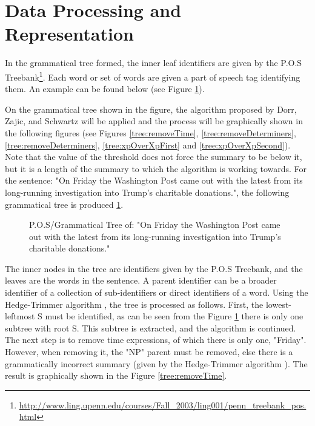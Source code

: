 \section{Data Processing and Representation}
\par In the grammatical tree formed, the inner leaf identifiers are given by the P.O.S Treebank\footnote{\url{http://www.ling.upenn.edu/courses/Fall_2003/ling001/penn_treebank_pos.html}}. Each word or set of words are given a part of speech tag identifying them. An example can be found below (see Figure \ref{tree:origString}).
\par On the grammatical tree shown in the figure, the algorithm proposed by Dorr, Zajic, and Schwartz \cite{dorrzajicschwartz2003} will be applied and the process will be graphically shown in the following figures (see Figures \ref{tree:removeTime}, \ref{tree:removeDeterminers}, \ref{tree:removeDeterminers}, \ref{tree:xpOverXpFirst} and \ref{tree:xpOverXpSecond}). Note that the value of the threshold does not force the summary to be below it, but it is a length of the summary to which the algorithm is working towards. For the sentence: "On Friday the Washington Post came out with the latest from its long-running investigation into Trump's charitable donations.", the following grammatical tree is produced \ref{tree:origString}.
\begin{figure}[H]
\caption{P.O.S/Grammatical Tree of: "On Friday the Washington Post came out with the latest from its long-running investigation into Trump's charitable donations."}
\label{tree:origString}
\end{figure}
\par The inner nodes in the tree are identifiers given by the P.O.S Treebank, and the leaves are the words in the sentence. A parent identifier can be a broader identifier of a collection of sub-identifiers or direct identifiers of a word. Using the Hedge-Trimmer algorithm \cite{dorrzajicschwartz2003}, the tree is processed as follows.  First, the lowest-leftmost S must be identified, as can be seen from the Figure \ref{tree:origString} there is only one subtree with root S. This subtree is  extracted, and the algorithm is continued. The next step is to remove time expressions, of which there is only one, "Friday". However, when removing it, the "NP" parent must be removed, else there is a grammatically incorrect summary (given by the Hedge-Trimmer algorithm  \cite{dorrzajicschwartz2003}). The result is graphically shown in the Figure \ref{tree:removeTime}.
